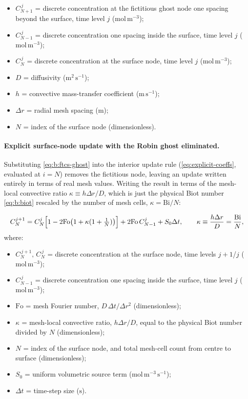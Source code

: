 \documentclass[11pt,a4paper]{article}
\newcommand{\Cd}[2]{C_{#1}^{#2}}
\newcommand{\dr}{\Delta r}
\newcommand{\dt}{\Delta t}
\newcommand{\Fo}{\mathrm{Fo}}
\newcommand{\Bi}{\mathrm{Bi}}
\begin{document}
\begin{itemize}[leftmargin=1.6em,itemsep=1pt,topsep=3pt,parsep=0pt]
  \item $C_{N+1}^{\,j}$ = discrete concentration at the fictitious ghost node one spacing beyond the surface, time level $j$ ($\mathrm{mol\,m^{-3}}$);
  \item $C_{N-1}^{\,j}$ = discrete concentration one spacing inside the surface, time level $j$ ($\mathrm{mol\,m^{-3}}$);
  \item $C_N^{\,j}$ = discrete concentration at the surface node, time level $j$ ($\mathrm{mol\,m^{-3}}$);
  \item $D$ = diffusivity ($\mathrm{m^{2}\,s^{-1}}$);
  \item $h$ = convective mass-transfer coefficient ($\mathrm{m\,s^{-1}}$);
  \item $\dr$ = radial mesh spacing ($\mathrm{m}$);
  \item $N$ = index of the surface node (dimensionless).
\end{itemize}

\paragraph{Explicit surface-node update with the Robin ghost eliminated.}
Substituting \cref{eq:b:ftcs-ghost} into the interior update rule
(\cref{eq:explicit-coeffs}, evaluated at $i=N$) removes the fictitious node,
leaving an update written entirely in terms of real mesh values. Writing the
result in terms of the mesh-local convective ratio $\kappa\equiv h\dr/D$,
which is just the physical Biot number \cref{eq:b:biot} rescaled by the
number of mesh cells, $\kappa=\Bi/N$:

\begin{equation}
\Cd{N}{j+1} = \Cd{N}{j}\Bigl[1-2\Fo\bigl(1+\kappa(1+\tfrac1N)\bigr)\Bigr]
+ 2\Fo\,\Cd{N-1}{j} + S_0\dt,
\qquad \kappa \equiv \frac{h\dr}{D} = \frac{\Bi}{N},
\label{eq:b:ftcs-surface}
\end{equation}
\vspace{-0.3em}
\noindent where:

\begin{itemize}[leftmargin=1.6em,itemsep=1pt,topsep=3pt,parsep=0pt]
  \item $C_N^{\,j+1},\,C_N^{\,j}$ = discrete concentration at the surface node, time levels $j{+}1$/$j$ ($\mathrm{mol\,m^{-3}}$);
  \item $C_{N-1}^{\,j}$ = discrete concentration one spacing inside the surface, time level $j$ ($\mathrm{mol\,m^{-3}}$);
  \item $\mathrm{Fo}$ = mesh Fourier number, $D\,\Delta t/\Delta r^{2}$ (dimensionless);
  \item $\kappa$ = mesh-local convective ratio, $h\Delta r/D$, equal to the physical Biot number divided by $N$ (dimensionless);
  \item $N$ = index of the surface node, and total mesh-cell count from centre to surface (dimensionless);
  \item $S_0$ = uniform volumetric source term ($\mathrm{mol\,m^{-3}\,s^{-1}}$);
  \item $\Delta t$ = time-step size ($\mathrm{s}$).
\end{itemize}
\end{document}
